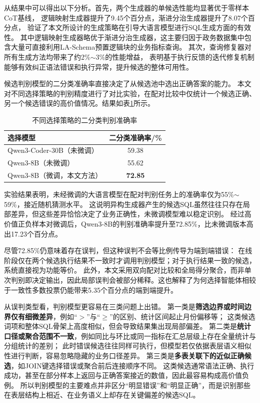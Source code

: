 从结果中可以得出以下分析。首先，两个生成器的单候选性能均显著优于零样本CoT基线，
逻辑映射生成器提升了9.45个百分点，渐进分治生成器提升了8.07个百分点，
验证了本文所设计的生成策略在引导大语言模型进行SQL生成方面的有效性。
其中逻辑映射生成器略优于渐进分治生成器，这主要归因于政务数据集中包含大量可直接利用LA-Schema预置逻辑块的业务指标查询。
其次，查询修复器对所有生成方法均带来了约2\%$\sim$3\%的性能增益，
表明基于执行反馈的迭代修复机制能够有效纠正语法错误和执行异常，提升候选的整体可用性。


候选判别模型的二分类准确率直接决定了从候选池中选出正确答案的能力。
本文对不同选择策略的判别精度进行了对比实验，在配对比较中仅统计一个候选正确、另一个候选错误的高价值情况。结果如表\ref{tab:selection_accuracy}所示。

\begin{table}[htbp]
	\setlength{\abovecaptionskip}{5pt}
	\setlength{\belowcaptionskip}{5pt}
	\caption{不同选择策略的二分类判别准确率}
	\label{tab:selection_accuracy}
	\centering
	\begin{tabular}{lc}
		\toprule
		选择模型 & 二分类准确率/\% \\
		\midrule
		Qwen3-Coder-30B（未微调） & 59.38 \\
		Qwen3-8B（未微调） & 55.62 \\
		Qwen3-8B（微调，本文方法） & \textbf{72.85} \\
		\bottomrule
	\end{tabular}
\end{table}

实验结果表明，未经微调的大语言模型在配对判别任务上的准确率仅为55\%$\sim$59\%，接近随机猜测水平。
这说明异构生成器产生的候选SQL虽然往往只存在局部差异，但这些差异恰恰决定了业务正确性，未微调模型难以稳定识别。
经过高价值正负样本对微调后，Qwen3-8B的判别准确率提升至72.85\%，比未微调版本高出17.23个百分点。

尽管72.85\%仍意味着存在误判，但这种误判不会等比例传导为端到端错误：
在线阶段仅在两个候选执行结果不一致时才调用判别模型；对于执行结果一致的候选，系统直接视为功能等价。
此外，本文采用双向配对比较和全局得分聚合，而非单次判别即决定输出，因此局部误判会被部分稀释。这也解释了为何选择智能体相较于一致性多数投票仍能带来5.35个百分点的端到端提升。

从误判类型看，判别模型更容易在三类问题上出错。
第一类是\textbf{筛选边界或时间边界仅有细微差异}，例如“$>$”与“$\geq$”的区别、统计区间起止月份偏移等；
这类候选词项和整体SQL骨架上高度相似，但会导致结果集出现局部偏差。
第二类是\textbf{统计口径或聚合范围不一致}，例如同比与环比或同一指标在汇总层级上存在全量统计与分组统计的差别；
此时错误候选往往同样可执行，但模型若仅依据表层语义相似性进行判断，容易忽略隐藏的业务口径差异。
第三类是\textbf{多表关联下的近似正确候选}，如JOIN键选择错误或聚合前后连接顺序不同。
这类候选通常语法正确、执行成功，甚至在部分样本上返回与正确答案接近的数值，因此最容易构成高价值负例。
所以判别模型的主要难点并非区分“明显错误”和“明显正确”，而是识别那些在表层结构上相近、在业务语义上却存在关键偏差的候选SQL。


